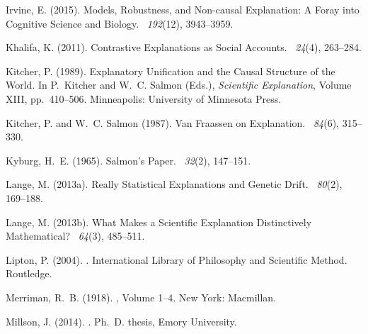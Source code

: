 \documentclass[natbib]{svjour3}                     %
\begin{document}
\begin{thebibliography}{19}
Irvine, E. (2015).
\newblock Models, Robustness, and Non-causal Explanation: A Foray into
  Cognitive Science and Biology.
~{\em 192\/}(12), 3943--3959.

Khalifa, K. (2011).
\newblock Contrastive Explanations as Social Accounts.
~{\em 24\/}(4), 263--284.

Kitcher, P. (1989).
\newblock Explanatory Unification and the Causal Structure of the World.
\newblock In P.~Kitcher and W.~C. Salmon (Eds.), {\em Scientific Explanation},
  Volume XIII, pp.\  410--506. Minneapolis: University of Minnesota Press.

Kitcher, P. and W.~C. Salmon (1987).
\newblock Van Fraassen on Explanation.
~{\em 84\/}(6), 315--330.

Kyburg, H.~E. (1965).
\newblock Salmon's Paper.
~{\em 32\/}(2), 147--151.

Lange, M. (2013a).
\newblock Really Statistical Explanations and Genetic Drift.
~{\em 80\/}(2), 169--188.

Lange, M. (2013b).
\newblock What Makes a Scientific Explanation Distinctively Mathematical?
~{\em 64\/}(3),
  485--511.

Lipton, P. (2004).
.
\newblock International Library of Philosophy and Scientific Method. Routledge.

Merriman, R.~B. (1918).
,
Volume 1--4.
\newblock New York: Macmillan.

Millson, J. (2014).
.
\newblock Ph.\ D. thesis, Emory University.


\end{thebibliography}
\end{document}
